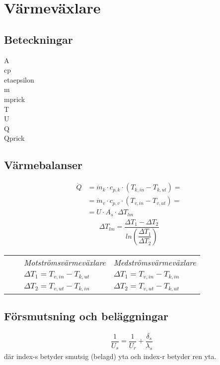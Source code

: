 \chapter{Värmeväxlare}
\section*{Beteckningar}

\acrfull{A} \\
\acrfull{cp} \\
\acrfull{etaepsilon} \\
\acrfull{m} \\
\acrfull{mprick} \\
\acrfull{T} \\
\acrfull{U} \\
\acrfull{Q} \\
\acrfull{Qprick}

\section*{Värmebalanser}
	\begin{align*}
		\dot{Q}&=\dot{m}_k\cdot c_{p,k}\cdot (T_{k,in}-T_{k,ut}) = \\
		       &=\dot{m}_v\cdot c_{p,v}\cdot (T_{v,in}-T_{v,ut}) = \\
		       &=U \cdot A_s \cdot \Delta T_{lm} 
	\end{align*}
	\begin{align*}
	\Delta T_{lm} = \dfrac{\Delta T_1 - \Delta T_2}{ln \left( \dfrac{\Delta T_1}{\Delta T_2}\right)}
	\end{align*}
	\begin{tabular}{l l l l}
    &&\textit{Motströmsvärmeväxlare} & \textit{Medströmsvärmeväxlare} \\
    &&$\Delta T_1 = T_{v,in} - T_{k,ut}$ & $\Delta T_1 = T_{v,in} - T_{k,in}$ \\
    &&$\Delta T_2 = T_{v,ut} - T_{k,in}$ & $\Delta T_2 = T_{v,ut} - T_{k,ut}$ \\
	\end{tabular}
	\section*{Försmutsning och beläggningar}
	\begin{align*}
		& \dfrac{1}{U_s} =\dfrac{1}{U_r} + \dfrac{\delta_s}{\lambda_s}
	\end{align*}
	där index-s betyder smutsig (belagd) yta och index-r betyder ren yta.
